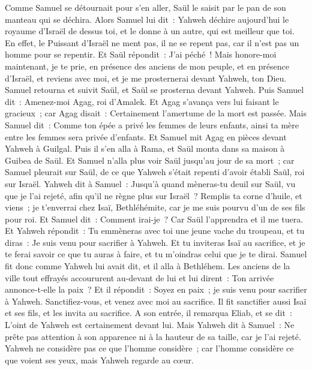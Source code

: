 \begin{multicols}{2}
Comme Samuel se détournait pour s'en aller, Saül le saisit par le pan de son manteau qui se déchira.
Alors Samuel lui dit~: Yahweh déchire aujourd'hui le royaume d'Israël de dessus toi, et le donne à un autre, qui est meilleur que toi.
En effet, le Puissant d'Israël ne ment pas, il ne se repent pas, car il n'est pas un homme pour se repentir.
Et Saül répondit~: J'ai péché~! Mais honore-moi maintenant, je te prie, en présence des anciens de mon peuple, et en présence d'Israël, et reviens avec moi, et je me prosternerai devant Yahweh, ton Dieu.
Samuel retourna et suivit Saül, et Saül se prosterna devant Yahweh.
Puis Samuel dit~: Amenez-moi Agag, roi d'Amalek. Et Agag s'avança vers lui faisant le gracieux~; car Agag disait~: Certainement l'amertume de la mort est passée.
Mais Samuel dit~: Comme ton épée a privé les femmes de leurs enfants, ainsi ta mère entre les femmes sera privée d'enfants. Et Samuel mit Agag en pièces devant Yahweh à Guilgal.
Puis il s'en alla à Rama, et Saül monta dans sa maison à Guibea de Saül.
Et Samuel n'alla plus voir Saül jusqu'au jour de sa mort~; car Samuel pleurait sur Saül, de ce que Yahweh s'était repenti d'avoir établi Saül, roi sur Israël.
\VerseOne{}Yahweh dit à Samuel~: Jusqu'à quand mèneras-tu deuil sur Saül, vu que je l'ai rejeté, afin qu'il ne règne plus sur Israël~? Remplis ta corne d'huile, et viens~; je t'enverrai chez Isaï, Bethléhémite, car je me suis pourvu d'un de ses fils pour roi.
Et Samuel dit~: Comment irai-je~? Car Saül l'apprendra et il me tuera. Et Yahweh répondit~: Tu emmèneras avec toi une jeune vache du troupeau, et tu diras~: Je suis venu pour sacrifier à Yahweh.
Et tu inviteras Isaï au sacrifice, et je te ferai savoir ce que tu auras à faire, et tu m'oindras celui que je te dirai.
Samuel fit donc comme Yahweh lui avait dit, et il alla à Bethléhem. Les anciens de la ville tout effrayés accoururent au-devant de lui et lui dirent~: Ton arrivée annonce-t-elle la paix~?
Et il répondit~: Soyez en paix~; je suis venu pour sacrifier à Yahweh. Sanctifiez-vous, et venez avec moi au sacrifice. Il fit sanctifier aussi Isaï et ses fils, et les invita au sacrifice.
A son entrée, il remarqua Eliab, et se dit~: L'oint de Yahweh est certainement devant lui.
Mais Yahweh dit à Samuel~: Ne prête pas attention à son apparence ni à la hauteur de sa taille, car je l'ai rejeté. Yahweh ne considère pas ce que l'homme considère~; car l'homme considère ce que voient ses yeux, mais Yahweh regarde au cœur.

\end{multicols}
